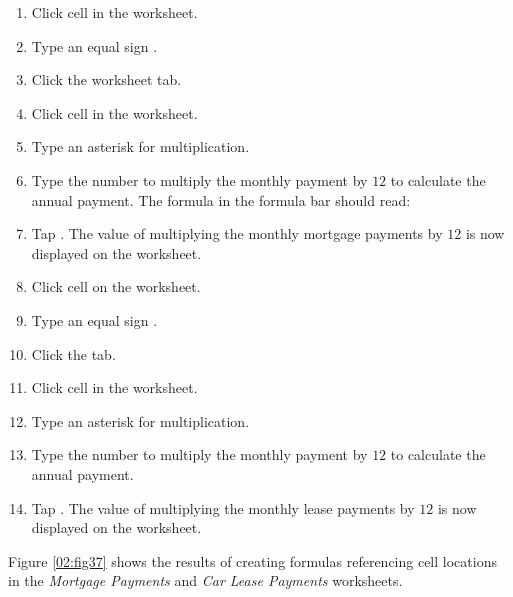 \begin{enumbox}
	\begin{enumerate}
		\item Click cell  in the  worksheet.
		\item Type an equal sign \fmtTyping{=}.
		\item Click the  worksheet tab.
		\item Click cell  in the  worksheet.
		\item Type an asterisk \fmtTyping{*} for multiplication.
		\item Type the number  to multiply the monthly payment by $ 12 $ to calculate the annual payment. The formula in the formula bar should read: 
		\item Tap . The value of multiplying the monthly mortgage payments by $ 12 $ is now displayed on the  worksheet.
		\item Click cell  on the  worksheet.
		\item Type an equal sign \fmtTyping{=}.
		\item Click the  tab.
		\item Click cell  in the  worksheet.
		\item Type an asterisk \fmtTyping{*} for multiplication.
		\item Type the number  to multiply the monthly payment by $ 12 $ to calculate the annual payment.
		\item Tap . The value of multiplying the monthly lease payments by $ 12 $ is now displayed on the  worksheet.
	\end{enumerate}
\end{enumbox}

Figure \ref{02:fig37} shows the results of creating formulas referencing cell locations in the \textit{Mortgage Payments} and \textit{Car Lease Payments} worksheets.

